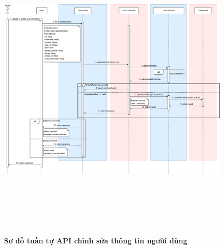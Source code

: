\begin{figure}[H]
	\centering
	\includegraphics[width=15cm,height=15cm]{Images/api_sequence/user/updateUserById.drawio.png}
	\caption[Sơ đồ tuần tự API chỉnh sửa thông tin người dùng]{\bfseries \fontsize{12pt}{0pt}\selectfont Sơ đồ tuần tự API chỉnh sửa thông tin người dùng}
	\label{sequence_diagram_update_user}
\end{figure}

